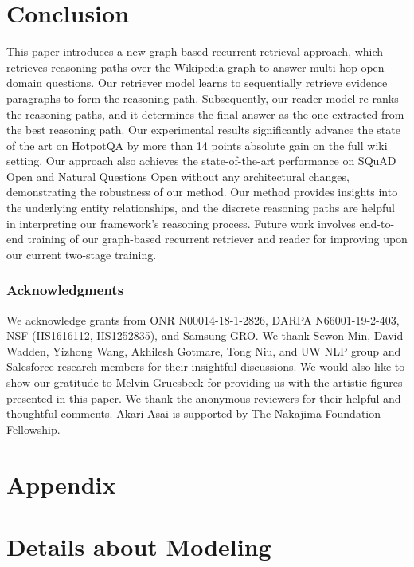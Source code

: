 \documentclass{article} \usepackage{iclr2020_conference,times}
\begin{document}
\section{Conclusion}
This paper introduces a new graph-based recurrent retrieval approach, which retrieves reasoning paths over the Wikipedia graph to answer multi-hop open-domain questions. 
Our retriever model learns to sequentially retrieve evidence paragraphs to form the reasoning path.
Subsequently, our reader model re-ranks the reasoning paths, and it determines the final answer as the one extracted from the best reasoning path. 
Our experimental results significantly advance the state of the art on HotpotQA by more than 14 points absolute gain on the full wiki setting.
Our approach also achieves the state-of-the-art performance on SQuAD Open and Natural Questions Open without any architectural changes, demonstrating the robustness of our method. 
Our method provides insights into the underlying entity relationships, and the discrete reasoning paths are helpful in interpreting our framework's reasoning process. Future work involves end-to-end training of our graph-based recurrent retriever and reader for improving upon our current two-stage training. 



\subsubsection*{Acknowledgments}
We acknowledge grants from ONR N00014-18-1-2826, DARPA
N66001-19-2-403, NSF (IIS1616112, IIS1252835), and Samsung GRO. 
We thank Sewon Min, David Wadden, Yizhong Wang, Akhilesh Gotmare, Tong Niu, and UW NLP group and Salesforce research members for their insightful discussions.
We would also like to show our gratitude to Melvin Gruesbeck for providing us with the artistic figures presented in this paper. 
We thank the anonymous reviewers for their helpful and thoughtful comments. 
Akari Asai is supported by The Nakajima Foundation Fellowship. 



\appendix

\section*{Appendix}


\section{Details about Modeling}
\end{document}
